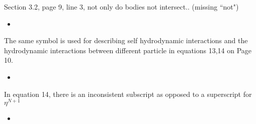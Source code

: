 \documentclass[11pt]{article}
\newcommand{\comment}[1]{{\color{blue} #1}}
\begin{document}
\noindent
\comment{Section 3.2, page 9, line 3, not only do bodies not intersect..
(missing ``not")}
\begin{itemize}
  \item
\end{itemize}

\noindent
\comment{The same symbol is used for describing self hydrodynamic
interactions and the hydrodynamic interactions between different
particle in equations 13,14 on Page 10.}
\begin{itemize}
  \item
\end{itemize}

\noindent
\comment{In equation 14, there is an inconsistent subscript as opposed
to a superscript for $\eta^{N+1}$}
\begin{itemize}
  \item
\end{itemize}
\end{document}
